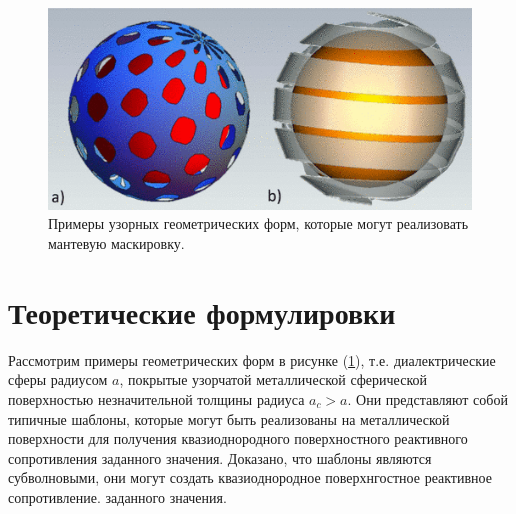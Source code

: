\documentclass[12pt,a4paper]{article}
\begin{document}
\begin{figure}[t]
  \centering
  \includegraphics[height=0.15\paperheight]{1.png}
  \caption{Примеры узорных геометрических форм, которые могут реализовать мантевую маскировку.}
  \label{fig:1}
\end{figure}

\section{Теоретические формулировки}
Рассмотрим примеры геометрических форм в рисунке (\ref{fig:1}), т.е. диалектрические сферы 
радиусом $a$,
покрытые узорчатой металлической сферической поверхностью незначительной толщины радиуса $
a_c > a$.
Они представляют собой типичные шаблоны, которые могут быть реализованы на металлической поверхности
для получения квазиоднородного поверхностного реактивного сопротивления заданного значения. Доказано, что
шаблоны являются субволновыми, они могут создать квазиоднородное поверхнгостное реактивное сопротивление.
заданного значения.
\end{document}

